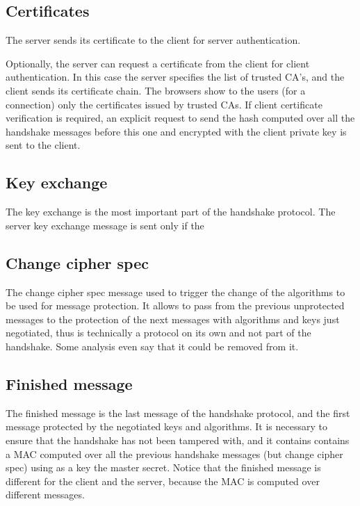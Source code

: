 \documentclass{report}
\begin{document}
\subsection{Certificates}
The server sends its certificate to the client for server
authentication.

Optionally, the server can request a certificate from the client for
client authentication. In this case the server specifies the list of
trusted CA's, and the client sends its certificate chain. The browsers
show to the users (for a connection) only the certificates issued by
trusted CAs.
If client certificate verification is required, an explicit request to
send the hash computed over all the handshake messages before this 
one and encrypted with the client private key is sent to the client.

\subsection{Key exchange}
The key exchange is the most important part of the handshake protocol.
The server key exchange message is sent only if the

\subsection{Change cipher spec}
The change cipher spec message used to trigger the change of the
algorithms to be used for message protection. It allows to pass from
the previous unprotected messages to the protection of the next
messages with algorithms and keys just negotiated, thus is technically
a protocol on its own and not part of the handshake. Some analysis
even say that it could be removed from it.


\subsection{Finished message}
The finished message is the last message of the handshake protocol,
and the first message protected by the negotiated keys and algorithms.
It is necessary to ensure that the handshake has not been tampered
with, and it contains contains a MAC computed over all the previous
handshake messages (but change cipher spec) using as a key the master
secret. Notice that the finished message is different for the client 
and the server, because the MAC is computed over different messages.
\end{document}
